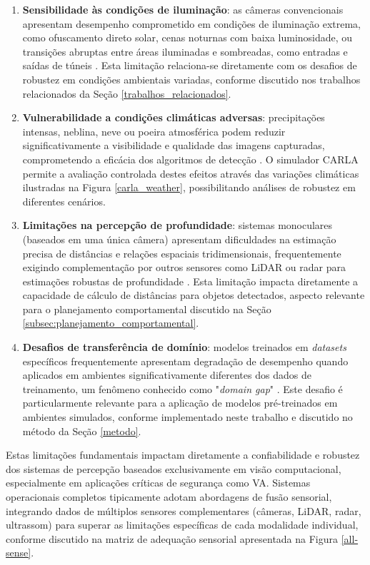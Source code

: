 \begin{enumerate}
    \item \textbf{Sensibilidade às condições de iluminação}: as câmeras convencionais apresentam desempenho comprometido em condições de iluminação extrema, como ofuscamento direto solar, cenas noturnas com baixa luminosidade, ou transições abruptas entre áreas iluminadas e sombreadas, como entradas e saídas de túneis \cite{kim2023challenges}. Esta limitação relaciona-se diretamente com os desafios de robustez em condições ambientais variadas, conforme discutido nos trabalhos relacionados da Seção \ref{trabalhos_relacionados}.
    
    \item \textbf{Vulnerabilidade a condições climáticas adversas}: precipitações intensas, neblina, neve ou poeira atmosférica podem reduzir significativamente a visibilidade e qualidade das imagens capturadas, comprometendo a eficácia dos algoritmos de detecção \cite{kim2023challenges}. O simulador CARLA permite a avaliação controlada destes efeitos através das variações climáticas ilustradas na Figura \ref{carla_weather}, possibilitando análises de robustez em diferentes cenários.
    
    \item \textbf{Limitações na percepção de profundidade}: sistemas monoculares (baseados em uma única câmera) apresentam dificuldades na estimação precisa de distâncias e relações espaciais tridimensionais, frequentemente exigindo complementação por outros sensores como LiDAR ou radar para estimações robustas de profundidade \cite{janai_computer_vision_av}. Esta limitação impacta diretamente a capacidade de cálculo de distâncias para objetos detectados, aspecto relevante para o planejamento comportamental discutido na Seção \ref{subsec:planejamento_comportamental}.
    
    \item \textbf{Desafios de transferência de domínio}: modelos treinados em \textit{datasets} específicos frequentemente apresentam degradação de desempenho quando aplicados em ambientes significativamente diferentes dos dados de treinamento, um fenômeno conhecido como "\textit{domain gap}" \cite{wu_physical_adversarial_attack}. Este desafio é particularmente relevante para a aplicação de modelos pré-treinados em ambientes simulados, conforme implementado neste trabalho e discutido no método da Seção \ref{metodo}.
\end{enumerate}

Estas limitações fundamentais impactam diretamente a confiabilidade e robustez dos sistemas de percepção baseados exclusivamente em visão computacional, especialmente em aplicações críticas de segurança como VA. Sistemas operacionais completos tipicamente adotam abordagens de fusão sensorial, integrando dados de múltiplos sensores complementares (câmeras, LiDAR, radar, ultrassom) para superar as limitações específicas de cada modalidade individual, conforme discutido na matriz de adequação sensorial apresentada na Figura \ref{all-sense}.


